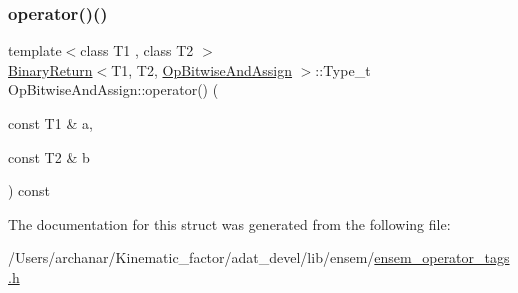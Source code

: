 \mbox{\label{structOpBitwiseAndAssign_a0ff733a94050f1eb8c0e52a8b1b27c01}} 
\subsubsection{\texorpdfstring{operator()()}{operator()()}\hspace{0.1cm}{\footnotesize\ttfamily [2/2]}}
{\footnotesize\ttfamily template$<$class T1 , class T2 $>$ \\
\mbox{\hyperlink{structBinaryReturn}{Binary\+Return}}$<$T1, T2, \mbox{\hyperlink{structOpBitwiseAndAssign}{Op\+Bitwise\+And\+Assign}} $>$\+::Type\+\_\+t Op\+Bitwise\+And\+Assign\+::operator() (\begin{DoxyParamCaption}\item[{const T1 \&}]{a,  }\item[{const T2 \&}]{b }\end{DoxyParamCaption}) const\hspace{0.3cm}{\ttfamily [inline]}}



The documentation for this struct was generated from the following file\+:\begin{DoxyCompactItemize}
\item 
/\+Users/archanar/\+Kinematic\+\_\+factor/adat\+\_\+devel/lib/ensem/\mbox{\hyperlink{lib_2ensem_2ensem__operator__tags_8h}{ensem\+\_\+operator\+\_\+tags.\+h}}\end{DoxyCompactItemize}
